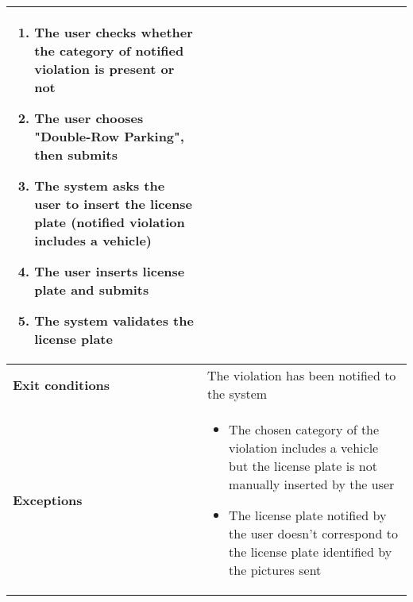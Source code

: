 \begin{description}
\begin{center}
\begin{tabular}{|p{3cm}|p{7cm}|}
\begin{enumerate}
                \item The user checks whether the category of notified violation is present or not
                \item The user chooses "Double-Row Parking", then submits
                \item The system asks the user to insert the license plate (notified violation includes a vehicle) 
                \item The user inserts license plate and submits 
                \item The system validates the license plate
            \end{enumerate} \\
            \hline
            \textbf{Exit conditions} & The violation has been notified to the system \\
            \hline
            \textbf{Exceptions}
            & \begin{itemize}
                \item The chosen category of the violation includes a vehicle but the license plate is not manually inserted by the user
                \item The license plate notified by the user doesn't correspond to the license plate identified by the pictures sent 
            \end{itemize} \\
            \hline
        \end{tabular}
    \end{center}
\end{description}


